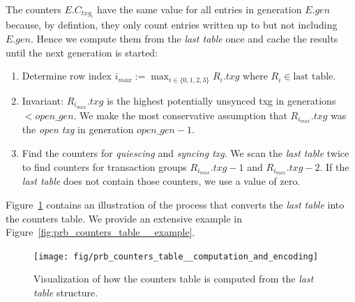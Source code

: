 \documentclass[12pt,a4paper,twoside]{book}
\begin{document}
The counters $E.C_{txg_i}$ have the same value for all entries in generation $E.gen$  because, by defintion, they only count entries written up to but not including $E.gen$.
Hence we compute them from the \textit{last table} once and cache the results until the next generation is started:
\begin{enumerate}[noitemsep]
    \item Determine row index $i_{max} := \max_{i \in \{0,1,2,3\}} R_i.txg$ where $R_i \in \text{last table}$.
    \item Invariant: $R_{i_{max}}.txg$ is the highest potentially unsynced txg in generations $< open\_gen$.
        We make the most conservative assumption that $R_{i_{max}}.txg$ was the \textit{open txg} in generation $open\_gen - 1$.
    \item Find the counters for \textit{quiescing} and \textit{syncing txg}.
        We scan the \textit{last table} twice to find counters for transaction groups $R_{i_{max}}.txg - 1$ and $R_{i_{max}}.txg - 2$.
        If the \textit{last table} does not contain those counters, we use a value of zero.
\end{enumerate}

Figure~\ref{fig:prb_counters_table__computation_and_encoding} contains an illustration of the process that converts the \textit{last table} into the counters table.
We provide an extensive example in Figure~\ref{fig:prb_counters_table__example}.

\begin{figure}[H]
    \centering
    \texttt{[image: fig/prb\_counters\_table\_\_computation\_and\_encoding]}
    \caption{
        Visualization of how the counters table is computed from the \textit{last table} structure.
    }
    \label{fig:prb_counters_table__computation_and_encoding}
\end{figure}
\end{document}
